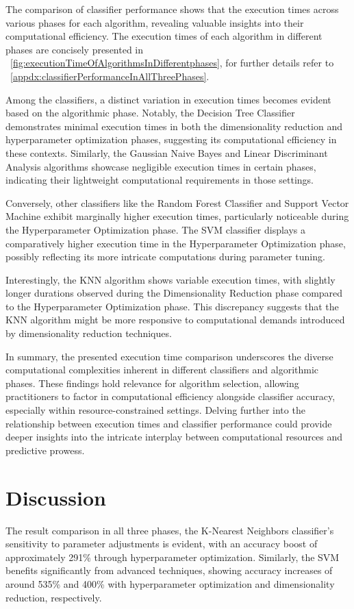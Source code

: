 \documentclass[conference,onecolumn]{IEEEtran}
\begin{document}
    The comparison of classifier performance shows that the execution times across various phases for each algorithm, revealing valuable insights into their computational efficiency. The execution times of each algorithm in different phases are concisely presented in \figurename~\ref{fig:executionTimeOfAlgorithmsInDifferentphases}, for further details refer to \appendixname~\ref{appdx:classifierPerformanceInAllThreePhases}.

    Among the classifiers, a distinct variation in execution times becomes evident based on the algorithmic phase. Notably, the Decision Tree Classifier demonstrates minimal execution times in both the dimensionality reduction and hyperparameter optimization phases, suggesting its computational efficiency in these contexts. Similarly, the Gaussian Naive Bayes and Linear Discriminant Analysis algorithms showcase negligible execution times in certain phases, indicating their lightweight computational requirements in those settings.

    Conversely, other classifiers like the Random Forest Classifier and Support Vector Machine exhibit marginally higher execution times, particularly noticeable during the Hyperparameter Optimization phase. The SVM classifier displays a comparatively higher execution time in the Hyperparameter Optimization phase, possibly reflecting its more intricate computations during parameter tuning.

    Interestingly, the KNN algorithm shows variable execution times, with slightly longer durations observed during the Dimensionality Reduction phase compared to the Hyperparameter Optimization phase. This discrepancy suggests that the KNN algorithm might be more responsive to computational demands introduced by dimensionality reduction techniques.

    In summary, the presented execution time comparison underscores the diverse computational complexities inherent in different classifiers and algorithmic phases. These findings hold relevance for algorithm selection, allowing practitioners to factor in computational efficiency alongside classifier accuracy, especially within resource-constrained settings. Delving further into the relationship between execution times and classifier performance could provide deeper insights into the intricate interplay between computational resources and predictive prowess.


\section{Discussion}
    The result comparison in all three phases, the K-Nearest Neighbors classifier's sensitivity to parameter adjustments is evident, with an accuracy boost of approximately 291\% through hyperparameter optimization. Similarly, the SVM benefits significantly from advanced techniques, showing accuracy increases of around 535\% and 400\% with hyperparameter optimization and dimensionality reduction, respectively.
\end{document}
